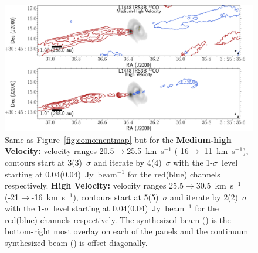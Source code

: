 \begin{figure}[H]
   \begin{center}
   \includegraphics[width=\textwidth]{img/L1448IRS3B_12CO_image_binned_clean__binnedMoments_panel2.pdf}
   \caption{Same as Figure~\ref{fig:comomentmap} but for the \textbf{Medium-high Velocity:} velocity ranges 20.5$\rightarrow$25.5~km~s$^{-1}$ (-16$\rightarrow$-11~km~s$^{-1}$), contours start at 3(3)~$\sigma$ and iterate by 4(4)~$\sigma$ with the 1-$\sigma$~level starting at 0.04(0.04)~Jy~beam$^{-1}$ for the red(blue) channels respectively. \textbf{High Velocity:} velocity ranges 25.5$\rightarrow$30.5~km~s$^{-1}$ (-21$\rightarrow$-16~km~s$^{-1}$), contours start at 5(5)~$\sigma$ and iterate by 2(2)~$\sigma$ with the 1-$\sigma$~level starting at 0.04(0.04)~Jy~beam$^{-1}$ for the red(blue) channels respectively. The \co\space synthesized beam (\cobeam) is the bottom-right most overlay on each of the panels and the continuum synthesized beam (\contbeam) is offset diagonally.}\label{fig:comomentmap2}
\end{center}
\end{figure}

